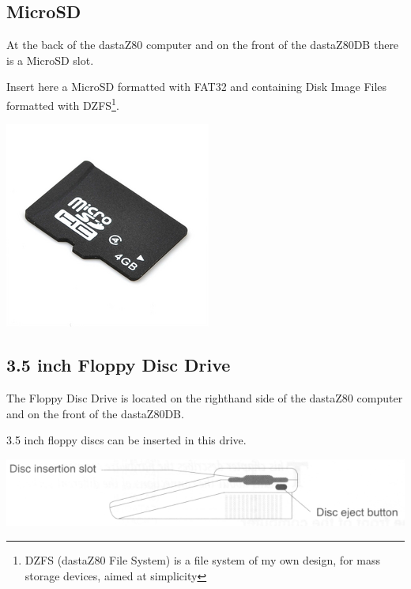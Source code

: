     \subsection{MicroSD}

    At the back of the dastaZ80 computer and on the front of the dastaZ80DB
    there is a MicroSD slot.

    Insert here a MicroSD formatted with FAT32 and containing Disk Image
    Files formatted with DZFS\footnote{DZFS (dastaZ80 File System) is a file
    system of my own design, for mass storage devices, aimed at simplicity}.

    \centerline{\includegraphics[scale=0.5]{images/microsdcard.png}}

    \subsection{3.5 inch Floppy Disc Drive}

    The Floppy Disc Drive is located on the righthand side of the dastaZ80
    computer and on the front of the dastaZ80DB.

    3.5 inch floppy discs can be inserted in this drive. 

    \includegraphics[scale=0.7]{images/discslot.png}

